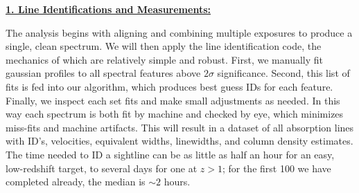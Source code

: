 \documentclass[12pt]{article}
\begin{document}





%
%
\describearchival       %

\noindent \textbf{\underline{1. Line Identifications and Measurements:}}

The analysis begins with aligning and combining multiple exposures to produce a single, clean spectrum. We will then apply the line identification code, the mechanics of which are relatively simple and robust. First, we manually fit gaussian profiles to all spectral features above $2\sigma$ significance. Second, this list of fits is fed into our algorithm, which produces best guess IDs for each feature. Finally, we inspect each set fits and make small adjustments as needed. In this way each spectrum is both fit by machine and checked by eye, which minimizes miss-fits and machine artifacts. This will result in a dataset of all absorption lines with ID's, velocities, equivalent widths, linewidths, and column density estimates. The time needed to ID a sightline can be as little as half an hour for an easy, low-redshift target, to several days for one at $z>1$; for the first 100 we have completed already, the median is $\sim 2$ hours.
\end{document}
